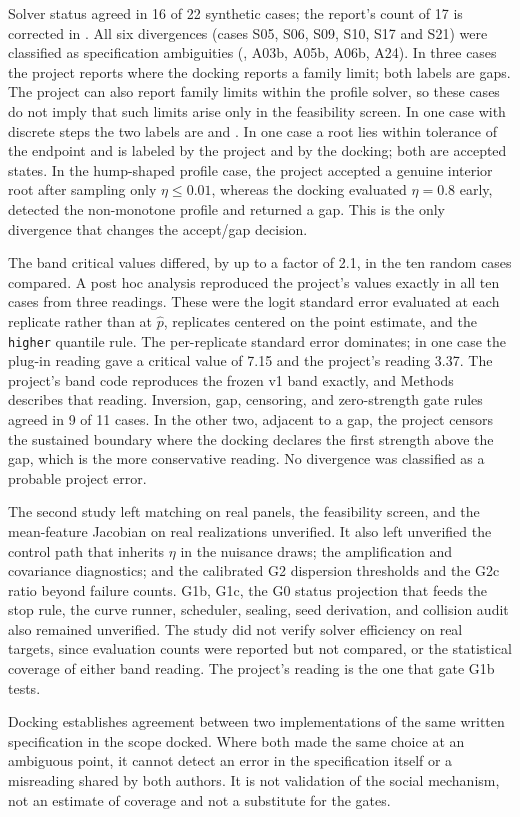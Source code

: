 Solver status agreed in 16 of 22 synthetic cases; the report's count of 17 is corrected in . All six divergences (cases S05, S06, S09, S10, S17 and S21) were classified as specification ambiguities (, A03b, A05b, A06b, A24). In three cases the project reports  where the docking reports a family limit; both labels are gaps. The project can also report family limits within the profile solver, so these cases do not imply that such limits arise only in the feasibility screen. In one case with discrete steps the two labels are  and . In one case a root lies within tolerance of the endpoint and is labeled  by the project and  by the docking; both are accepted states. In the hump-shaped profile case, the project accepted a genuine interior root after sampling only $\eta\leq0.01$, whereas the docking evaluated $\eta=0.8$ early, detected the non-monotone profile and returned a gap. This is the only divergence that changes the accept/gap decision.

The band critical values differed, by up to a factor of 2.1, in the ten random cases compared. A post hoc analysis reproduced the project's values exactly in all ten cases from three readings. These were the logit standard error evaluated at each replicate rather than at $\hat p$, replicates centered on the point estimate, and the \texttt{higher} quantile rule. The per-replicate standard error dominates; in one case the plug-in reading gave a critical value of 7.15 and the project's reading 3.37. The project's band code reproduces the frozen v1 band exactly, and Methods describes that reading. Inversion, gap, censoring, and zero-strength gate rules agreed in 9 of 11 cases. In the other two, adjacent to a gap, the project censors the sustained boundary where the docking declares the first strength above the gap, which is the more conservative reading. No divergence was classified as a probable project error.

The second study left matching on real panels, the feasibility screen, and the mean-feature Jacobian on real realizations unverified. It also left unverified the control path that inherits $\eta$ in the nuisance draws; the amplification and covariance diagnostics; and the calibrated G2 dispersion thresholds and the G2c ratio beyond failure counts. G1b, G1c, the G0 status projection that feeds the stop rule, the curve runner, scheduler, sealing, seed derivation, and collision audit also remained unverified. The study did not verify solver efficiency on real targets, since evaluation counts were reported but not compared, or the statistical coverage of either band reading. The project's reading is the one that gate G1b tests.

Docking establishes agreement between two implementations of the same written specification in the scope docked. Where both made the same choice at an ambiguous point, it cannot detect an error in the specification itself or a misreading shared by both authors. It is not validation of the social mechanism, not an estimate of coverage and not a substitute for the gates.
